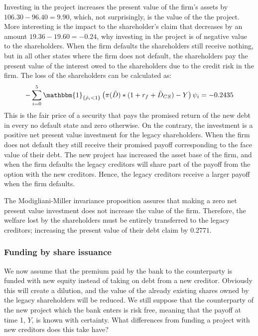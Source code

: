 \documentclass[../main.tex]{subfiles}
\begin{document}
        Investing in the project increases the present value of the firm's assets by $106.30 - 96.40 = 9.90$, which, not surprisingly, is the value of the the project. More interesting is the impact to the shareholder's claim that decreases by an amount $19.36 - 19.60 = -0.24$, why investing in the project is of negative value to the shareholders. When the firm defaults the shareholders still receive nothing, but in all other states where the firm does not default, the shareholders pay the present value of the interest owed to the shareholders due to the credit risk in the firm. The loss of the shareholders can be calculated as: 
            \begin{align}
                -\sum_{i=0}^{5} 
                    \mathbbm{1}_{\{\tilde{\rho}_{i} < 1\}}
                    \left(
                        \pi(\tilde{D})*(1+r_{f} + \tilde{D}_{CS})
                        - Y
                    \right)
                    \psi_{i} = -0.2435
            \end{align}
        This is the fair price of a security that pays the promised return of the new debt in every no default state and zero otherwise. 
        On the contrary, the investment is a positive net present value investment for the legacy shareholders. When the firm does not default they still receive their promised payoff corresponding to the face value of their debt. The new project has increased the asset base of the firm, and when the firm defaults the legacy creditors will share part of the payoff from the option with the new creditors. Hence, the legacy creditors receive a larger payoff when the firm defaults. 

        The Modigliani-Miller invariance proposition assures that making a zero net present value investment does not increase the value of the firm. Therefore, the welfare lost by the shareholders must be entirely transferred to the legacy creditors; increasing the present value of their debt claim by $0.2771$.


    \subsubsection{Funding by share issuance}
        We now assume that the premium paid by the bank to the counterparty is funded with new equity instead of taking on debt from a new creditor. Obviously this will create a dilution, and the value of the already existing shares owned by the legacy shareholders will be reduced. We still suppose that the counterparty of the new project which the bank enters is risk free, meaning that the payoff at time 1, $Y$, is known with certainty. What differences from funding a project with new creditors does this take have?
\end{document}
